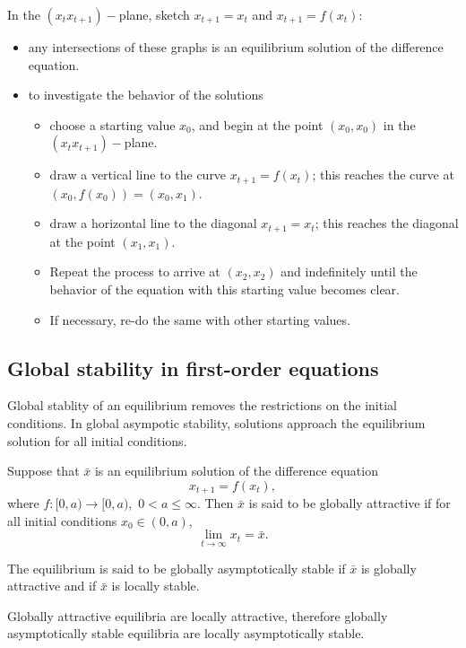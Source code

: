 In the $(x_tx_{t+1})-$plane, sketch $x_{t+1}=x_{t}$ and $x_{t+1}=f(x_t)$:
\begin{itemize}
\item any intersections of these graphs is an equilibrium solution of the difference equation.
\item to investigate the behavior of the solutions
\begin{itemize}
\item choose a starting value $x_0$, and begin at the point $(x_0,x_0)$ in the $(x_tx_{t+1})-$plane.
\item draw a vertical line to the curve $x_{t+1}=f(x_t)$; this reaches the curve at $(x_0,f(x_0))=(x_0,x_1)$.
\item draw a horizontal line to the diagonal $x_{t+1}=x_t$; this reaches the diagonal at the point $(x_1,x_1)$.
\item Repeat the process to arrive at $(x_2,x_2)$ and indefinitely until the behavior of the equation with this starting value becomes clear.
\item If necessary, re-do the same with other starting values.
\end{itemize}
\end{itemize}




\subsection{Global stability in first-order equations}
Global stablity of an equilibrium removes the restrictions on the initial conditions. In global asympotic stability, solutions approach the equilibrium solution for all initial conditions. 


\begin{definition}
Suppose that $\bar x$ is an equilibrium solution of the difference equation $$x_{t+1}=f(x_t),$$
where $f: [0,a)\rightarrow [0,a),$ $0<a\leq \infty$. Then $\bar x$ is said to be globally attractive if for all initial conditions $x_0\in (0,a)$, $$\lim_{t\rightarrow \infty}x_t=\bar x.$$

The equilibrium is said to be globally asymptotically stable if $\bar x$ is globally attractive and if $\bar x$ is locally stable.
\end{definition}
Globally attractive equilibria are locally attractive, therefore globally asymptotically stable equilibria are locally asymptotically stable.




